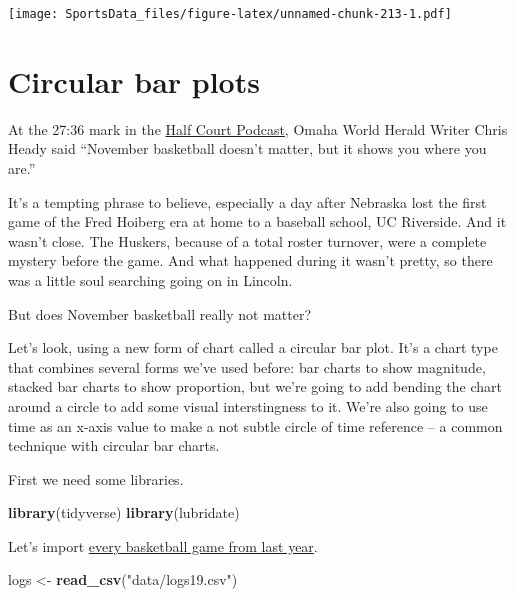 \documentclass[]{book}
\newenvironment{Shaded}{\begin{snugshade}}{\end{snugshade}}
\newcommand{\KeywordTok}[1]{\textcolor[rgb]{0.13,0.29,0.53}{\textbf{#1}}}
\newcommand{\NormalTok}[1]{#1}
\newcommand{\StringTok}[1]{\textcolor[rgb]{0.31,0.60,0.02}{#1}}
\begin{document}
\texttt{[image: SportsData\_files/figure-latex/unnamed-chunk-213-1.pdf]}

\hypertarget{circular-bar-plots}{%
\chapter{Circular bar plots}\label{circular-bar-plots}}

At the 27:36 mark in the \href{https://www.omaha.com/sports/podcasts/half-court-press/half-court-press-creighton-cruises-in-opener-nebraska-stunned-in/article_67081a35-3a8f-5e9e-ae67-e88fcacbb362.html}{Half Court Podcast}, Omaha World Herald Writer Chris Heady said ``November basketball doesn't matter, but it shows you where you are.''

It's a tempting phrase to believe, especially a day after Nebraska lost the first game of the Fred Hoiberg era at home to a baseball school, UC Riverside. And it wasn't close. The Huskers, because of a total roster turnover, were a complete mystery before the game. And what happened during it wasn't pretty, so there was a little soul searching going on in Lincoln.

But does November basketball really not matter?

Let's look, using a new form of chart called a circular bar plot. It's a chart type that combines several forms we've used before: bar charts to show magnitude, stacked bar charts to show proportion, but we're going to add bending the chart around a circle to add some visual interstingness to it. We're also going to use time as an x-axis value to make a not subtle circle of time reference -- a common technique with circular bar charts.

First we need some libraries.

\begin{Shaded}
\begin{Highlighting}[]
\KeywordTok{library}\NormalTok{(tidyverse)}
\KeywordTok{library}\NormalTok{(lubridate)}
\end{Highlighting}
\end{Shaded}

Let's import \href{https://unl.box.com/s/a8m91bro10t89watsyo13yjegb1fy009}{every basketball game from last year}.

\begin{Shaded}
\begin{Highlighting}[]
\NormalTok{logs <-}\StringTok{ }\KeywordTok{read_csv}\NormalTok{(}\StringTok{"data/logs19.csv"}\NormalTok{)}
\end{Highlighting}
\end{Shaded}
\end{document}
